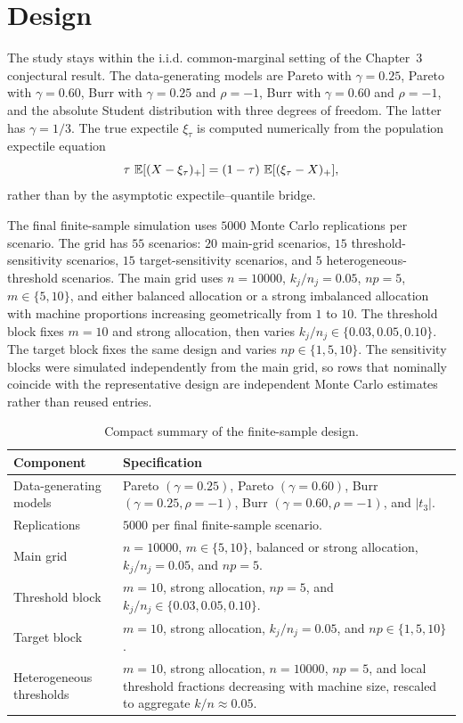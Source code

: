 \section{Design}
\label{sec:sim:design}

The study stays within the i.i.d. common-marginal setting of the Chapter~3
conjectural result. The
data-generating models are Pareto with \(\gamma=0.25\), Pareto with
\(\gamma=0.60\), Burr with \(\gamma=0.25\) and \(\rho=-1\), Burr with
\(\gamma=0.60\) and \(\rho=-1\), and the absolute Student distribution with
three degrees of freedom. The latter has \(\gamma=1/3\). The true expectile
\(\xi_\tau\) is computed numerically from the population expectile equation
\[
  \tau\,\operatorname{\mathbb{E}}[(X-\xi_\tau)_+]
  =
  (1-\tau)\,\operatorname{\mathbb{E}}[(\xi_\tau-X)_+],
\]
rather than by the asymptotic expectile--quantile bridge.

The final finite-sample simulation uses \(5000\) Monte Carlo replications per
scenario. The grid has \(55\) scenarios: \(20\) main-grid scenarios, \(15\)
threshold-sensitivity scenarios, \(15\) target-sensitivity scenarios, and
\(5\) heterogeneous-threshold scenarios. The main grid uses \(n=10000\),
\(k_j/n_j=0.05\), \(np=5\), \(m\in\{5,10\}\), and either balanced allocation
or a strong imbalanced allocation with machine proportions increasing
geometrically from \(1\) to \(10\). The threshold block fixes \(m=10\) and
strong allocation, then varies \(k_j/n_j\in\{0.03,0.05,0.10\}\). The target
block fixes the same design and varies \(np\in\{1,5,10\}\).
The sensitivity blocks were simulated independently from the main grid, so
rows that nominally coincide with the representative design are independent
Monte Carlo estimates rather than reused entries.

\begin{table}[htbp]
\centering
\small
\caption{Compact summary of the finite-sample design.}
\label{tab:sim:design-summary}
\setlength{\tabcolsep}{4pt}
\begin{tabular}{@{}>{\raggedright\arraybackslash}p{}
                  >{\raggedright\arraybackslash}p{}@{}}
\toprule
Component & Specification \\
\midrule
Data-generating models &
Pareto \((\gamma=0.25)\), Pareto \((\gamma=0.60)\), Burr
\((\gamma=0.25,\rho=-1)\), Burr \((\gamma=0.60,\rho=-1)\), and
\(|t_3|\). \\
Replications &
\(5000\) per final finite-sample scenario. \\
Main grid &
\(n=10000\), \(m\in\{5,10\}\), balanced or strong allocation,
\(k_j/n_j=0.05\), and \(np=5\). \\
Threshold block &
\(m=10\), strong allocation, \(np=5\), and
\(k_j/n_j\in\{0.03,0.05,0.10\}\). \\
Target block &
\(m=10\), strong allocation, \(k_j/n_j=0.05\), and
\(np\in\{1,5,10\}\). \\
Heterogeneous thresholds &
\(m=10\), strong allocation, \(n=10000\), \(np=5\), and local threshold
fractions decreasing with machine size, rescaled to aggregate \(k/n\approx0.05\). \\
\bottomrule
\end{tabular}
\end{table}

